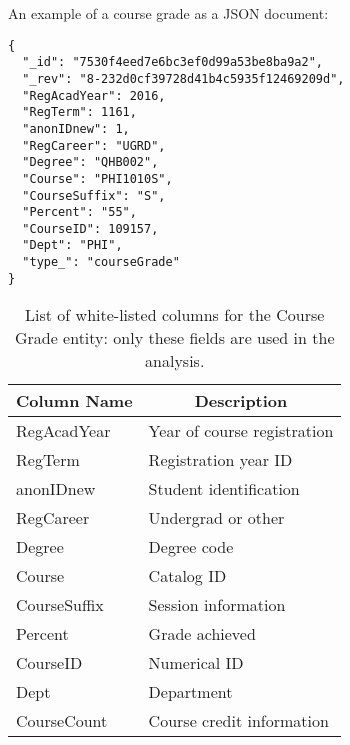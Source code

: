 An example of a course grade as a JSON document:

\begin{verbatim}
{
  "_id": "7530f4eed7e6bc3ef0d99a53be8ba9a2",
  "_rev": "8-232d0cf39728d41b4c5935f12469209d",
  "RegAcadYear": 2016,
  "RegTerm": 1161,
  "anonIDnew": 1,
  "RegCareer": "UGRD",
  "Degree": "QHB002",
  "Course": "PHI1010S",
  "CourseSuffix": "S",
  "Percent": "55",
  "CourseID": 109157,
  "Dept": "PHI",
  "type_": "courseGrade"
}
\end{verbatim}

\begin{table}[H]
    \centering
    \label{Grades Columns}
    \begin{tabular}{|l|l|}
        \hline
        \multicolumn{1}{|c|}{\textbf{Column Name}} & \multicolumn{1}{c|}{\textbf{Description}} \\
        \hline
        RegAcadYear                                & Year of course registration               \\
        RegTerm                                    & Registration year ID                      \\
        anonIDnew                                  & Student identification                    \\
        RegCareer                                  & Undergrad or other                        \\
        Degree                                     & Degree code                               \\
        Course                                     & Catalog ID                                \\
        CourseSuffix                               & Session information                       \\
        Percent                                    & Grade achieved                            \\
        CourseID                                   & Numerical ID                              \\
        Dept                                       & Department                                \\
        CourseCount                                & Course credit information                 \\
        \hline
    \end{tabular}
    \caption{List of white-listed columns for the Course Grade entity: only these fields are used in the analysis.}
\end{table}

